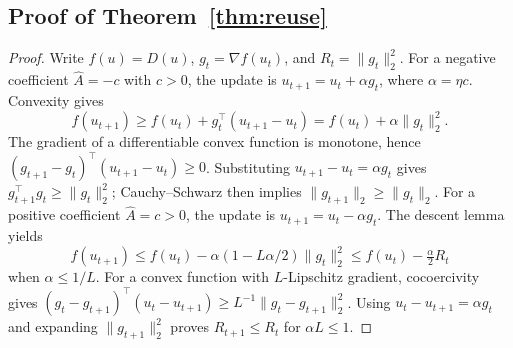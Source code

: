 \subsection{Proof of Theorem~\ref{thm:reuse}}
\label{app:proof-reuse}
\begin{proof}
Write $f(u)=D(u)$, $g_t=\nabla f(u_t)$, and $R_t=\|g_t\|_2^2$.
For a negative coefficient $\widehat A=-c$ with $c>0$, the update is $u_{t+1}=u_t+\alpha g_t$, where $\alpha=\eta c$.
Convexity gives
\begin{equation}
f(u_{t+1})\ge f(u_t)+g_t^\top(u_{t+1}-u_t)
=f(u_t)+\alpha\|g_t\|_2^2.
\end{equation}
The gradient of a differentiable convex function is monotone, hence
$(g_{t+1}-g_t)^\top(u_{t+1}-u_t)\ge0$.
Substituting $u_{t+1}-u_t=\alpha g_t$ gives
$g_{t+1}^\top g_t\ge\|g_t\|_2^2$; Cauchy--Schwarz then implies
$\|g_{t+1}\|_2\ge\|g_t\|_2$.
For a positive coefficient $\widehat A=c>0$, the update is $u_{t+1}=u_t-\alpha g_t$.
The descent lemma yields
\begin{equation}
f(u_{t+1})\le f(u_t)-\alpha(1-L\alpha/2)\|g_t\|_2^2
\le f(u_t)-\tfrac\alpha2R_t
\end{equation}
when $\alpha\le1/L$.
For a convex function with $L$-Lipschitz gradient, cocoercivity gives
$(g_t-g_{t+1})^\top(u_t-u_{t+1})\ge L^{-1}\|g_t-g_{t+1}\|_2^2$.
Using $u_t-u_{t+1}=\alpha g_t$ and expanding $\|g_{t+1}\|_2^2$ proves
$R_{t+1}\le R_t$ for $\alpha L\le1$.
\end{proof}

